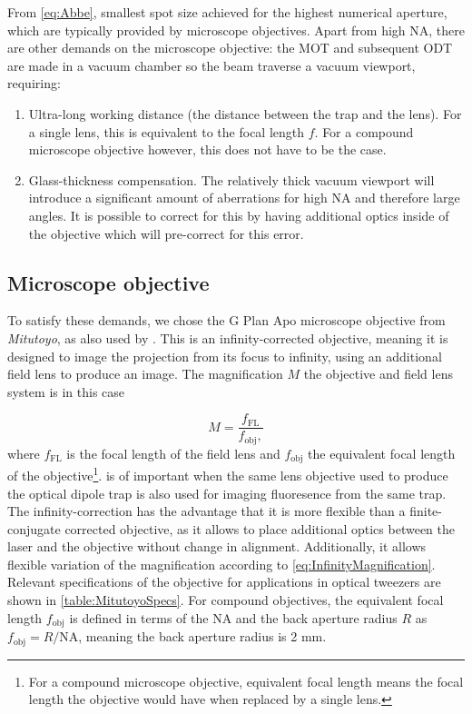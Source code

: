 From \cref{eq:Abbe}, smallest spot size achieved for the highest numerical aperture, which are typically provided by microscope objectives. 
Apart from high NA, there are other demands on the microscope objective: the \ac{MOT} and subsequent \ac{ODT} are made in a vacuum chamber so the beam traverse a vacuum viewport, requiring:

\begin{enumerate}
	\item Ultra-long working distance (the distance between the trap and the lens). For a single lens, this is equivalent to the focal length $f$.
	For a compound microscope objective however, this does not have to be the case.
	
	\item Glass-thickness compensation. The relatively thick vacuum viewport will introduce a significant amount of aberrations for high NA and therefore large angles. It is possible to correct for this by having additional optics inside of the objective which will pre-correct for this error.
\end{enumerate}

\subsection{Microscope objective}

To satisfy these demands, we chose the G Plan Apo microscope objective from \textit{Mitutoyo}, as also used by \cite{Ebadi2021,Manuel2016}. 
This is an infinity-corrected objective, meaning it is designed to image the projection from its focus to infinity, using an additional field lens to produce an image.
The magnification $M$ the objective and field lens system is in this case 

\begin{equation}\label{eq:InfinityMagnification}
	M = \frac{
		f_{\text{FL}}
	}{
		f_{\text{obj}},
	}
\end{equation}
where $f_{\text{FL}}$ is the focal length of the field lens and $f_{\text{obj}}$ the equivalent focal length of the objective\footnote{For a compound microscope objective, equivalent focal length means the focal length the objective would have when replaced by a single lens.}.
 is of important when the same lens objective used to produce the optical dipole trap is also used for imaging fluoresence from the same trap.
The infinity-correction has the advantage that it is more flexible than a finite-conjugate corrected objective, as it allows to place additional optics between the laser and the objective without change in alignment.
Additionally, it allows flexible variation of the magnification according to \cref{eq:InfinityMagnification}.
Relevant specifications of the objective for applications in optical tweezers are shown in \cref{table:MitutoyoSpecs}. 
For compound objectives, the equivalent focal length $f_{\text{obj}}$ is defined in terms of the \ac{NA} and the back aperture radius $R$ as $f_{\text{obj}} = R / \text{NA}$, meaning the back aperture radius is 2 mm.

